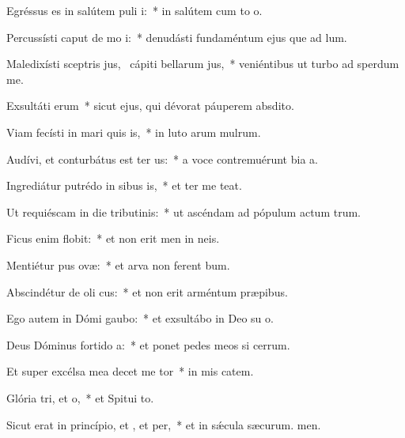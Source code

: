 \item Egréssus es in salútem puli i:~* in salútem cum to o.
\item Percussísti caput de mo i:~* denudásti fundaméntum ejus que ad lum.
\item Maledixísti sceptris jus,~\pscross{} cápiti bellarum jus,~* veniéntibus ut turbo ad sperdum me.
\item Exsultáti erum~* sicut ejus, qui dévorat páuperem  absdito.
\item Viam fecísti in mari quis is,~* in luto arum mulrum.
\item Audívi, et conturbátus est ter us:~* a voce contremuérunt bia a.
\item Ingrediátur putrédo in sibus is,~* et ter me teat.
\item Ut requiéscam in die tributinis:~* ut ascéndam ad pópulum actum trum.
\item Ficus enim  flobit:~* et non erit men in neis.
\item Mentiétur pus ovæ:~* et arva non ferent bum.
\item Abscindétur de oli cus:~* et non erit arméntum  præpibus.
\item Ego autem in Dómi gaubo:~* et exsultábo in Deo su o.
\item Deus Dóminus fortido a:~* et ponet pedes meos si cerrum.
\item Et super excélsa mea decet me tor~* in mis catem.
\item Glória tri, et o,~* et Spitui to.
\item Sicut erat in princípio, et , et per,~* et in sǽcula sæcurum. men.
